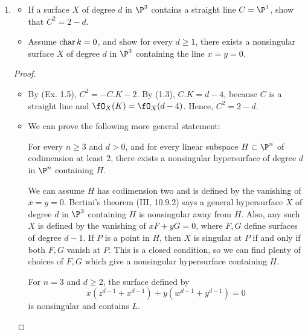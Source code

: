 \documentclass[a4paper]{article}
\begin{document}
\begin{enumerate} [label=\textbf{\arabic*.}, leftmargin=0em]
    \item \begin{itemize}
              \item[(a)] If a surface $X$ of degree $d$ in $\P^3$ contains a straight line $C = \P^1$, show that $C^2 = 2 - d$.
              \item[(b)] Assume $\operatorname{char}{k} = 0$, and show for every $d \geq 1$, there exists a nonsingular surface $X$ of degree $d$ in $\P^3$ containing the line $x = y = 0$.
          \end{itemize}

          \begin{proof} $ $ \vspace{0pt}
              \begin{itemize} [leftmargin=0cm]
                  \item[(a)] By (Ex. 1.5), $C^2 = -C.K - 2$.
                        By (1.3), $C.K = d - 4$, because $C$ is a straight line and $\fO_X(K) = \fO_X(d - 4)$.
                        Hence, $C^2 = 2 - d$.

                  \item[(b)] We can prove the following more general statement:
                        \begin{proposition}
                            For every $n \geq 3$ and $d > 0$, and for every linear subspace $H \subset \P^n$ of codimension at least 2, there exists a nonsingular hypersurface of degree $d$ in $\P^n$ containing $H$.
                        \end{proposition}
                        We can assume $H$ has codimension two and is defined by the vanishing of $x = y = 0$.
                        Bertini's theorem (III, 10.9.2) says a general hypersurface $X$ of degree $d$ in $\P^3$ containing $H$ is nonsingular away from $H$.
                        Also, any such $X$ is defined by the vanishing of $xF + yG = 0$, where $F, G$ define surfaces of degree $d - 1$.
                        If $P$ is a point in $H$, then $X$ is singular at $P$ if and only if both $F, G$ vanish at $P$.
                        This is a closed condition, so we can find plenty of choices of $F, G$ which give a nonsingular hypersurface containing $H$.

                        \begin{example}
                            For $n = 3$ and $d \geq 2$, the surface defined by $$x(z^{d - 1} + x^{d - 1}) + y(w^{d - 1} + y^{d - 1}) = 0$$ is nonsingular and contains $L$.
                        \end{example}
              \end{itemize}
          \end{proof}


\end{enumerate}
\end{document}

